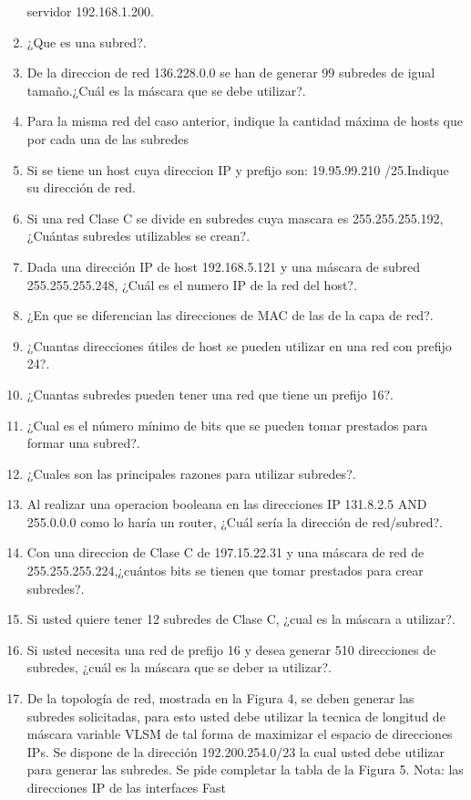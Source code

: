 \documentclass{udparticle}
\begin{document}
\begin{enumerate}
servidor 192.168.1.200.
\item ¿Que es una subred?.
\item De la direccion de red 136.228.0.0 se han de generar 99 subredes de igual tamaño.¿Cuál es la máscara que se debe utilizar?.
\item Para la misma red del caso anterior, indique la cantidad máxima de hosts que por cada una de las subredes
\item Si se tiene un host cuya direccion IP y prefijo son: 19.95.99.210 
/25.Indique su dirección de red.
\item Si una red Clase C se divide en subredes cuya mascara es 255.255.255.192, ¿Cuántas subredes utilizables se crean?.
\item Dada una dirección IP de host 192.168.5.121 y una máscara de 
subred 255.255.255.248, ¿Cuál es el numero IP de la red del host?.
\item ¿En que se diferencian las direcciones de MAC de las de la capa de red?.
\item ¿Cuantas direcciones útiles de host se pueden utilizar en una red con prefijo 24?.
\item ¿Cuantas subredes pueden tener una red que tiene un prefijo 16?.
\item ¿Cual es el número mínimo de bits que se pueden tomar prestados para formar una subred?.
\item ¿Cuales son las principales razones para utilizar subredes?.
\item Al realizar una operacion booleana en las direcciones IP 131.8.2.5
AND 255.0.0.0 como lo haría un router, ¿Cuál sería la dirección de 
red/subred?.
\item Con una direccion de Clase C de 197.15.22.31 y una máscara de red 
de 255.255.255.224,¿cuántos bits se tienen que tomar prestados para 
crear subredes?.
\item Si usted quiere tener 12 subredes de Clase C, ¿cual es la máscara 
a utilizar?.
\item Si usted necesita una red de prefijo 16 y desea generar 510 
direcciones de subredes, ¿cuál es la máscara que se deber ıa utilizar?.
\item De la topología de red, mostrada en la Figura 4, se deben generar 
las subredes solicitadas, para esto usted debe utilizar la tecnica de 
longitud de máscara variable VLSM de tal forma de maximizar el espacio 
de direcciones IPs. Se dispone de la dirección 192.200.254.0/23 la cual 
usted debe utilizar para generar las subredes. Se pide completar la 
tabla de la Figura 5. Nota: las direcciones IP de las interfaces Fast 

\end{enumerate}
\end{document}
